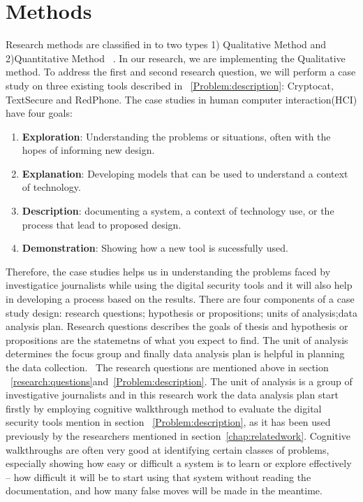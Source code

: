 \chapter{Methods}
 Research methods are classified in to two types 1) Qualitative Method and 2)Quantitative Method ~\cite{lazar2010research}. In our research, we are implementing the Qualitative method. To address the first and second research question, we will perform a case study on  three existing tools described in ~\ref{Problem:description}: Cryptocat, TextSecure and RedPhone. The case studies in human computer interaction(HCI) have four goals:~\cite{lazar2010research}
 \begin{enumerate} 
 	\item \textbf{Exploration}: Understanding the problems or situations, often with the hopes of informing new design.
 	\item \textbf{Explanation}: Developing models that can be used to understand a context of technology.
 	\item \textbf{Description}: documenting a system, a context of technology use, or the process that lead to proposed design.
 	\item \textbf{Demonstration}: Showing how a new tool is sucessfully used.~\cite{lazar2010research}
 \end{enumerate}
 Therefore, the case studies helps us in understanding the problems faced by investigatice journalists while using the digital security tools and it will also  help in developing a process based on the results. There are four components of a case study design: research questions; hypothesis or propositions; units of analysis;data analysis plan. Research questions describes the goals of thesis and hypothesis or propositions are the statemetns of what you expect to find. The unit of analysis determines the focus group and finally data analysis plan is helpful in planning the data collection.~\cite{lazar2010research} The research questions are mentioned above in section ~\ref{research:questions}and~\ref{Problem:description}. The unit of analysis is a group of investigative journalists and in this research work the data analysis plan start firstly by  employing cognitive walkthrough method to  evaluate the digital security tools mention in section ~\ref{Problem:description}, as it has been used previously by the researchers mentioned in section~\ref{chap:relatedwork}. Cognitive walkthroughs are often very good at identifying certain classes of problems, especially showing how easy or difficult a system is to learn or explore effectively – how difficult it will be to start using that system without reading the documentation, and how many false moves will be made in the meantime.~\cite{wharton1994cognitive}\\
 

